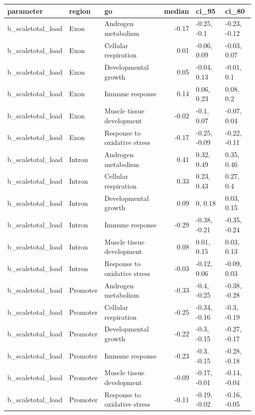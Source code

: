 \documentclass[
  letterpaper,
  DIV=11,
  numbers=noendperiod]{scrreprt}
\begin{document}
\begin{tabular}[t]{l|l|l|r|l|l}
\hline
parameter & region & go & median & ci\_95 & ci\_80\\
\hline
b\_scaletotal\_load & Exon & Androgen metabolism & -0.17 & -0.25, -0.1 & -0.23, -0.12\\
\hline
b\_scaletotal\_load & Exon & Cellular respiration & 0.01 & -0.06, 0.09 & -0.03, 0.07\\
\hline
b\_scaletotal\_load & Exon & Developmental growth & 0.05 & -0.04, 0.13 & -0.01, 0.1\\
\hline
b\_scaletotal\_load & Exon & Immune response & 0.14 & 0.06, 0.23 & 0.08, 0.2\\
\hline
b\_scaletotal\_load & Exon & Muscle tissue development & -0.02 & -0.1, 0.07 & -0.07, 0.04\\
\hline
b\_scaletotal\_load & Exon & Response to oxidative stress & -0.17 & -0.25, -0.09 & -0.22, -0.11\\
\hline
b\_scaletotal\_load & Intron & Androgen metabolism & 0.41 & 0.32, 0.49 & 0.35, 0.46\\
\hline
b\_scaletotal\_load & Intron & Cellular respiration & 0.33 & 0.23, 0.43 & 0.27, 0.4\\
\hline
b\_scaletotal\_load & Intron & Developmental growth & 0.09 & 0, 0.18 & 0.03, 0.15\\
\hline
b\_scaletotal\_load & Intron & Immune response & -0.29 & -0.38, -0.21 & -0.35, -0.24\\
\hline
b\_scaletotal\_load & Intron & Muscle tissue development & 0.08 & 0.01, 0.15 & 0.03, 0.13\\
\hline
b\_scaletotal\_load & Intron & Response to oxidative stress & -0.03 & -0.12, 0.06 & -0.09, 0.03\\
\hline
b\_scaletotal\_load & Promoter & Androgen metabolism & -0.33 & -0.4, -0.25 & -0.38, -0.28\\
\hline
b\_scaletotal\_load & Promoter & Cellular respiration & -0.25 & -0.34, -0.16 & -0.3, -0.19\\
\hline
b\_scaletotal\_load & Promoter & Developmental growth & -0.22 & -0.3, -0.15 & -0.27, -0.17\\
\hline
b\_scaletotal\_load & Promoter & Immune response & -0.23 & -0.3, -0.15 & -0.28, -0.18\\
\hline
b\_scaletotal\_load & Promoter & Muscle tissue development & -0.09 & -0.17, -0.01 & -0.14, -0.04\\
\hline
b\_scaletotal\_load & Promoter & Response to oxidative stress & -0.11 & -0.19, -0.02 & -0.16, -0.05\\
\hline
\end{tabular}
\end{document}
